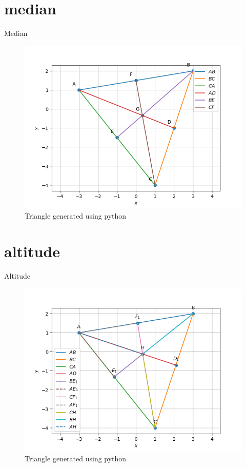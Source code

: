 \documentclass[journal,12pt,onecolumn]{IEEEtran}
\theoremstyle{remark}
\begin{document}
\begin{table}[!ht]
	\section{median}
	\centering
	
	\caption{Median}
	\label{table:median}
\end{table}
\begin{figure}
\includegraphics[width=\columnwidth]{./figs/Q1.2.2.png}
\caption{Triangle generated using python}
\label{fig:median}
\end{figure}
\begin{table}[!ht]
	\section{altitude}
	\centering
	
	\caption{Altitude}
	\label{table:Altitude}
\end{table}
\begin{figure}
\includegraphics[width=\columnwidth]{./figs/Q1.3.4.png}
\caption{Triangle generated using python}
\label{fig:altitude}
\end{figure}
\end{document}
